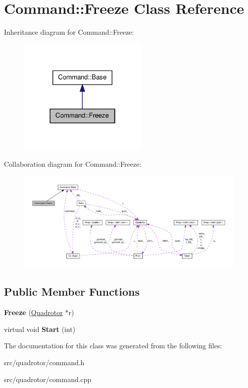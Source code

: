 \hypertarget{classCommand_1_1Freeze}{\section{\-Command\-:\-:\-Freeze \-Class \-Reference}
\label{classCommand_1_1Freeze}
}


\-Inheritance diagram for \-Command\-:\-:\-Freeze\-:\nopagebreak
\begin{figure}[H]
\begin{center}
\leavevmode
\includegraphics[width=178pt]{classCommand_1_1Freeze__inherit__graph}
\end{center}
\end{figure}


\-Collaboration diagram for \-Command\-:\-:\-Freeze\-:\nopagebreak
\begin{figure}[H]
\begin{center}
\leavevmode
\includegraphics[width=350pt]{classCommand_1_1Freeze__coll__graph}
\end{center}
\end{figure}
\subsection*{\-Public \-Member \-Functions}
\begin{DoxyCompactItemize}
\item 
\hypertarget{classCommand_1_1Freeze_aec86b6e382bba9633b4eb7f965080265}{{\bfseries \-Freeze} (\hyperlink{classQuadrotor}{\-Quadrotor} $\ast$r)}\label{classCommand_1_1Freeze_aec86b6e382bba9633b4eb7f965080265}

\item 
\hypertarget{classCommand_1_1Freeze_a2903673ebb811dc5b18177d9b0ac174a}{virtual void {\bfseries \-Start} (int)}\label{classCommand_1_1Freeze_a2903673ebb811dc5b18177d9b0ac174a}

\end{DoxyCompactItemize}


\-The documentation for this class was generated from the following files\-:\begin{DoxyCompactItemize}
\item 
src/quadrotor/command.\-h\item 
src/quadrotor/command.\-cpp\end{DoxyCompactItemize}
